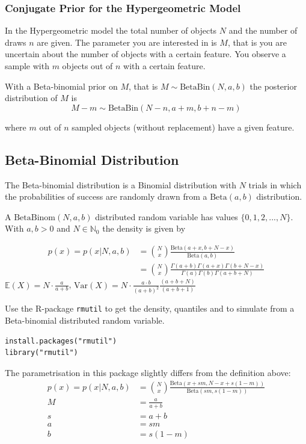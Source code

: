 \documentclass[11pt]{article}
\begin{document}
\subsubsection{Conjugate Prior for the Hypergeometric Model}
In the Hypergeometric model the total number of objects $N$ and the number of draws $n$ are given. The parameter you are interested in is $M$, that is you are uncertain about the number of objects with a certain feature. You observe a sample with $m$ objects out of $n$ with a certain feature.

With a Beta-binomial prior on $M$, that is $M \sim \text{BetaBin}(N,a,b)$ the posterior distribution of $M$ is
\begin{equation*}
	M - m \sim \text{BetaBin}(N - n,a + m,b + n - m)
\end{equation*}

where $m$ out of $n$ sampled objects (without replacement) have a given feature.

\subsection{Beta-Binomial Distribution}
The Beta-binomial distribution is a Binomial distribution with $N$ trials in which the probabilities of success are randomly drawn
 from a $\text{Beta}(a,b)$ distribution.

A $\text{BetaBinom}(N,a,b)$ distributed random variable has values $\{0,1,2,...,N\}$. With $a,b>0$ and $N\in\mathbb{N}_0$ the density is given by

\begin{align*}
	p(x) = p(x|N,a,b) &= \binom{N}{x}\frac{\text{Beta}(a+x,b+N-x)}{\text{Beta}(a,b)}\\
	&= \binom{N}{x}\frac{\Gamma(a+b)\Gamma(a+x)\Gamma(b+N-x)}{\Gamma(a)\Gamma(b)\Gamma(a+b+N)}
\end{align*}
\noindent
$\mathbb{E}(X)=N\cdot\frac{a}{a+b}$, $\text{Var}(X) = N\cdot\frac{a\cdot b}{(a+b)^2}\frac{(a+b+N)}{(a+b+1)}$

Use the R-package \texttt{rmutil} to get the density, quantiles and to simulate from a Beta-binomial distributed random variable.
\begin{verbatim}
install.packages("rmutil")
library("rmutil")
\end{verbatim}

The parametrisation in this package slightly differs from the definition above:
\begin{align*}
	p(x) = p(x|N,a,b) &= \binom{N}{x}\frac{\text{Beta}(x+sm,N-x+s(1-m))}{\text{Beta}(sm,s(1-m))}\\
	M &= \frac{a}{a+b}\\
	s &= a+b\\
	a &=sm\\
	b &= s(1-m)
\end{align*}
\end{document}
